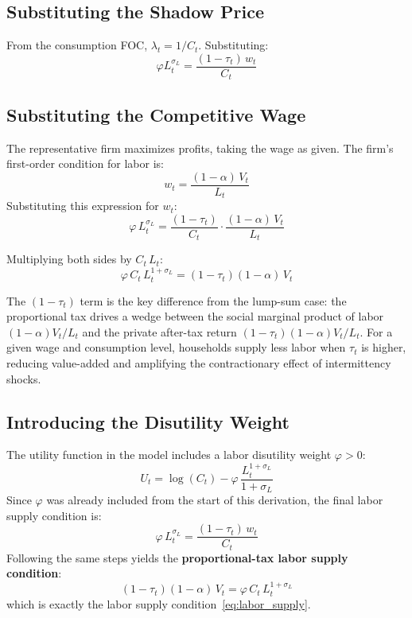 \documentclass[12pt, a4paper]{article}
\begin{document}
\subsection*{Substituting the Shadow Price}

From the consumption FOC, $\lambda_t = 1/C_t$. Substituting:
\begin{equation*}
\varphi L_t^{\sigma_L} = \frac{(1-\tau_t)\, w_t}{C_t}
\end{equation*}

\subsection*{Substituting the Competitive Wage}

The representative firm maximizes profits, taking the wage as given. The firm's first-order condition for labor is:
\begin{equation*}
w_t = \frac{(1-\alpha)\,V_t}{L_t}
\end{equation*}
Substituting this expression for $w_t$:
\begin{equation*}
\varphi\, L_t^{\sigma_L} = \frac{(1-\tau_t)}{C_t} \cdot \frac{(1-\alpha)\,V_t}{L_t}
\end{equation*}

Multiplying both sides by $C_t \, L_t$:
\begin{equation*}
\varphi \, C_t \, L_t^{1+\sigma_L} = (1-\tau_t)(1-\alpha)\,V_t
\end{equation*}

\noindent The $(1-\tau_t)$ term is the key difference from the lump-sum case: the proportional tax drives a wedge between the social marginal product of labor $(1-\alpha)V_t/L_t$ and the private after-tax return $(1-\tau_t)(1-\alpha)V_t/L_t$. For a given wage and consumption level, households supply less labor when $\tau_t$ is higher, reducing value-added and amplifying the contractionary effect of intermittency shocks.

\subsection*{Introducing the Disutility Weight}

The utility function in the model includes a labor disutility weight $\varphi > 0$:
\begin{equation*}
U_t = \log(C_t) - \varphi\,\frac{L_t^{1+\sigma_L}}{1+\sigma_L}
\end{equation*}
Since $\varphi$ was already included from the start of this derivation, the final labor supply condition is:
\begin{equation*}
\varphi\, L_t^{\sigma_L} = \frac{(1-\tau_t)\,w_t}{C_t}
\end{equation*}
Following the same steps yields the \textbf{proportional-tax labor supply condition}:
\begin{equation*}
(1-\tau_t)(1-\alpha)\,V_t = \varphi\,C_t\,L_t^{1+\sigma_L}
\end{equation*}
which is exactly the labor supply condition~\eqref{eq:labor_supply}.
\end{document}
